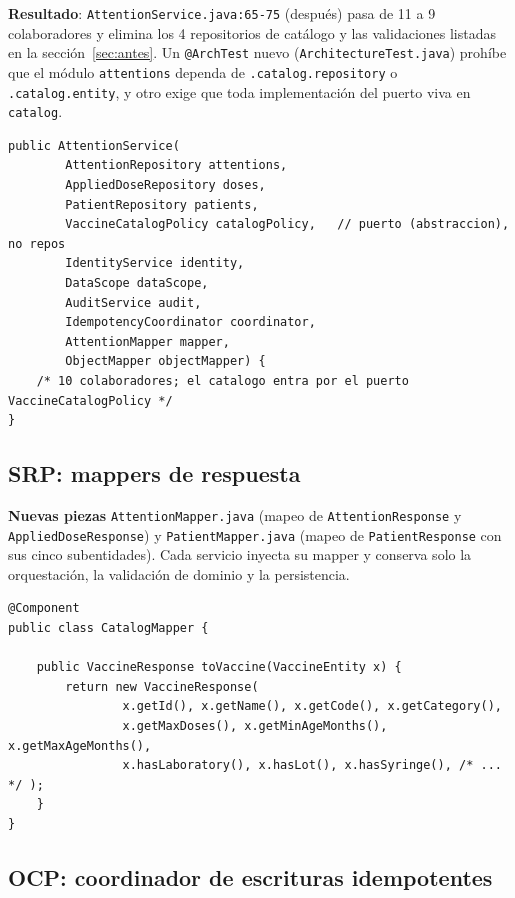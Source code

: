 \documentclass[11pt,a4paper]{article}
\begin{document}
\textbf{Resultado}: \texttt{AttentionService.java:65-75} (después) pasa de 11 a
9 colaboradores y elimina los 4 repositorios de catálogo y las validaciones
listadas en la sección~\ref{sec:antes}. Un \texttt{@ArchTest} nuevo
(\texttt{ArchitectureTest.java}) prohíbe que el módulo \texttt{attentions}
dependa de \texttt{.catalog.repository} o \texttt{.catalog.entity}, y otro exige
que toda implementación del puerto viva en \texttt{catalog}.

\begin{lstlisting}[caption={AttentionService.java --- constructor (después), fragmento real}]
public AttentionService(
        AttentionRepository attentions,
        AppliedDoseRepository doses,
        PatientRepository patients,
        VaccineCatalogPolicy catalogPolicy,   // puerto (abstraccion), no repos
        IdentityService identity,
        DataScope dataScope,
        AuditService audit,
        IdempotencyCoordinator coordinator,
        AttentionMapper mapper,
        ObjectMapper objectMapper) {
    /* 10 colaboradores; el catalogo entra por el puerto VaccineCatalogPolicy */
}
\end{lstlisting}

\subsection{SRP: mappers de respuesta}

\textbf{Nuevas piezas} \texttt{AttentionMapper.java} (mapeo de
\texttt{AttentionResponse} y \texttt{AppliedDoseResponse}) y
\texttt{PatientMapper.java} (mapeo de \texttt{PatientResponse} con sus cinco
subentidades). Cada servicio inyecta su mapper y conserva solo la
orquestación, la validación de dominio y la persistencia.

\begin{lstlisting}[caption={CatalogMapper.java (después) --- mapeo centralizado SRP/DRY, fragmento real}]
@Component
public class CatalogMapper {

    public VaccineResponse toVaccine(VaccineEntity x) {
        return new VaccineResponse(
                x.getId(), x.getName(), x.getCode(), x.getCategory(),
                x.getMaxDoses(), x.getMinAgeMonths(), x.getMaxAgeMonths(),
                x.hasLaboratory(), x.hasLot(), x.hasSyringe(), /* ... */ );
    }
}
\end{lstlisting}

\subsection{OCP: coordinador de escrituras idempotentes}
\end{document}
